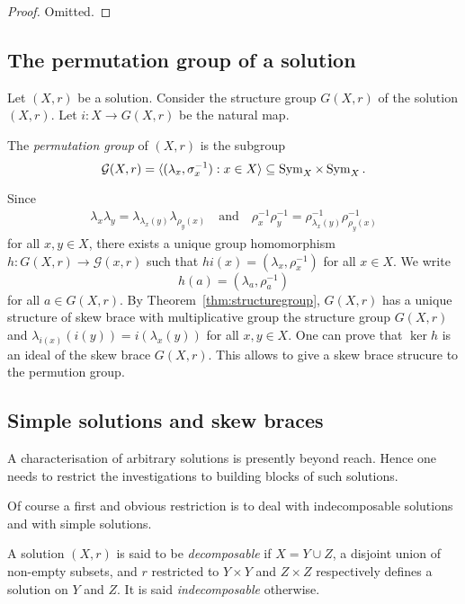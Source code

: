     \begin{proof}
        Omitted.
    \end{proof}

    \subsection{The permutation group of a solution}

    Let $(X,r)$ be a solution. Consider the structure group $G(X,r)$ of the solution $(X,r)$. Let $i\colon X\to G(X,r)$ be the natural map. 

    The \emph{permutation group} of $(X,r)$ is the subgroup
    \[\mathcal{G}(X,r)=\langle (\lambda_x,\sigma^{-1}_x) : x\in X\rangle\subseteq\operatorname{Sym}_X\times\operatorname{Sym}_X.\]
    
    Since 
    \begin{align*}
        \lambda_x\lambda_y=\lambda_{\lambda_x(y)}\lambda_{\rho_y(x)}\quad\text{and}\quad \rho^{-1}_x\rho^{-1}_y=\rho^{-1}_{\lambda_x(y)}\rho^{-1}_{\rho_y(x)}
    \end{align*}
    for all $x,y\in X$, there exists a unique group homomorphism
    $h\colon G(X,r)\to \mathcal{G}(x,r)$ such that $hi(x)=(\lambda_x,\rho^{-1}_x)$ for all $x\in X$. We write
    \[ h(a)=(\lambda_a,\rho_a^{-1})\]
    for all $a\in G(X,r)$.
    By Theorem~\ref{thm:structuregroup}, $G(X,r)$ has a unique structure of skew brace with multiplicative group the structure group $G(X,r)$ and $\lambda_{i(x)}(i(y))=i(\lambda_x(y))$ for all $x,y\in X$. One can prove that $\ker h$ is an ideal of the skew brace $G(X,r)$. This allows to give a skew brace strucure to the permution group.

\subsection{Simple solutions and skew braces}

A characterisation of arbitrary solutions is presently beyond reach. Hence one needs to
restrict the investigations to building blocks of such solutions. 

Of course a first and obvious restriction is to deal with
indecomposable solutions and with simple solutions. 

\begin{definition}
    A solution $(X,r)$  is said to be \emph{decomposable} if $X=Y\cup Z$, a disjoint
    union of non-empty subsets, and $r$ restricted to $Y\times Y$ and $Z\times Z$ respectively defines a solution on $Y$ and $Z$. It is said \emph{indecomposable} otherwise.
\end{definition}

